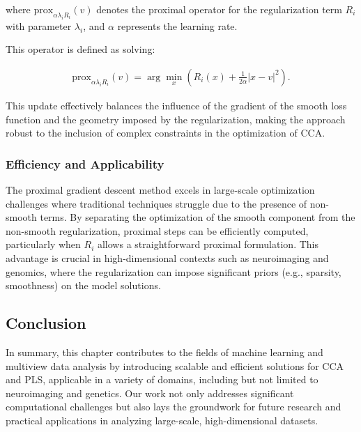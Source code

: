 where $\text{prox}_{\alpha \lambda_i R_i}(v)$ denotes the proximal operator for the regularization term $R_i$ with parameter $\lambda_i$, and $\alpha$ represents the learning rate.

This operator is defined as solving:

\begin{align*}
\text{prox}_{\alpha \lambda_i R_i}(v) = \arg \min_x \left( R_i(x) + \frac{1}{2\alpha} |x - v|^2 \right).
\end{align*}

This update effectively balances the influence of the gradient of the smooth loss function and the geometry imposed by the regularization, making the approach robust to the inclusion of complex constraints in the optimization of CCA.

\subsubsection{Efficiency and Applicability}

The proximal gradient descent method excels in large-scale optimization challenges where traditional techniques struggle due to the presence of non-smooth terms. By separating the optimization of the smooth component from the non-smooth regularization, proximal steps can be efficiently computed, particularly when $R_i$ allows a straightforward proximal formulation. This advantage is crucial in high-dimensional contexts such as neuroimaging and genomics, where the regularization can impose significant priors (e.g., sparsity, smoothness) on the model solutions.

\subsection{Conclusion}

In summary, this chapter contributes to the fields of machine learning and multiview data analysis by introducing scalable and efficient solutions for CCA and PLS, applicable in a variety of domains, including but not limited to neuroimaging and genetics.
Our work not only addresses significant computational challenges but also lays the groundwork for future research and practical applications in analyzing large-scale, high-dimensional datasets.